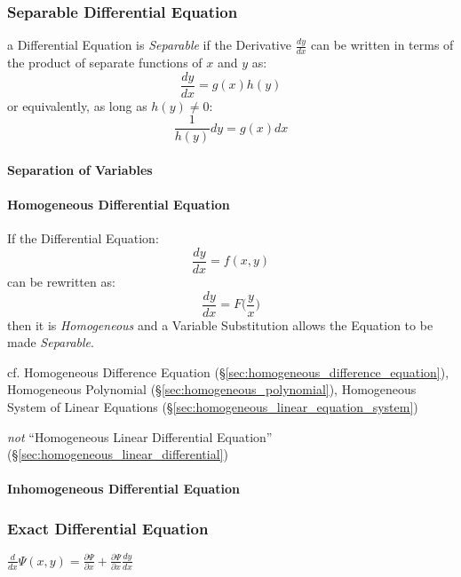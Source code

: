 \subsubsection{Separable Differential Equation}\label{sec:separable}

a Differential Equation is \emph{Separable} if the Derivative $\frac{dy}{dx}$
can be written in terms of the product of separate functions of $x$ and $y$ as:
\[
  \frac{dy}{dx} = g(x)h(y)
\]
or equivalently, as long as $h(y) \neq 0$:
\[
  \frac{1}{h(y)} dy = g(x) dx
\]



\paragraph{Separation of Variables}\label{sec:separation_of_variables}\hfill

\paragraph{Homogeneous Differential Equation}
\label{sec:homogeneous_differential_equation}

If the Differential Equation:
\[
  \frac{dy}{dx} = f(x,y)
\]
can be rewritten as:
\[
  \frac{dy}{dx} = F\Big(\frac{y}{x}\Big)
\]
then it is \emph{Homogeneous} and a Variable Substitution allows the Equation to
be made \emph{Separable}.

cf. Homogeneous Difference Equation
(\S\ref{sec:homogeneous_difference_equation}), Homogeneous Polynomial
(\S\ref{sec:homogeneous_polynomial}), Homogeneous System of Linear Equations
(\S\ref{sec:homogeneous_linear_equation_system})

\emph{not} ``Homogeneous Linear Differential Equation''
(\S\ref{sec:homogeneous_linear_differential})



\paragraph{Inhomogeneous Differential Equation}
\label{sec:inhomogeneous_differential_equation}



\subsubsection{Exact Differential Equation}\label{sec:exact_equation}

$\frac{d}{dx}\Psi(x,y) = \frac{\partial{\Psi}}{\partial{x}}
  + \frac{\partial{\Psi}}{\partial{x}}\frac{dy}{dx}$

